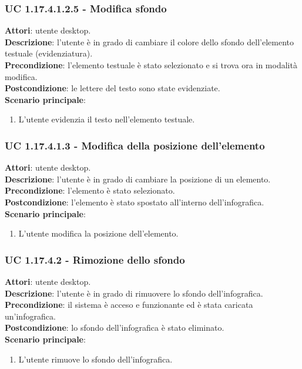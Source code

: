 \subsubsection{UC 1.17.4.1.2.5 - Modifica sfondo}{
	\label{uc1.17.4.1.2.5}
	\textbf{Attori}: utente desktop. \\
	\textbf{Descrizione}: l'utente è in grado di cambiare il colore dello sfondo dell’elemento testuale (evidenziatura). \\
	\textbf{Precondizione}: l'elemento testuale è stato selezionato e si trova ora in modalità modifica.\\
	\textbf{Postcondizione}: le lettere del testo sono state evidenziate.\\
	\textbf{Scenario principale}:
	\begin{enumerate}
		\item L'utente evidenzia il testo nell’elemento testuale.
	\end{enumerate}			
	}
\subsubsection{UC 1.17.4.1.3 - Modifica della posizione dell'elemento}{
	\label{uc1.17.4.1.3}
	\textbf{Attori}: utente desktop. \\
	\textbf{Descrizione}: l'utente è in grado di cambiare la posizione di un elemento. \\
	\textbf{Precondizione}: l'elemento è stato selezionato.\\
	\textbf{Postcondizione}: l'elemento è stato spostato all’interno dell’infografica.\\
	\textbf{Scenario principale}:
	\begin{enumerate}
		\item L'utente modifica la posizione dell'elemento.
	\end{enumerate}			
	}
\subsubsection{UC 1.17.4.2 - Rimozione dello sfondo}{
	\label{uc1.17.4.2}
	\textbf{Attori}: utente desktop. \\
	\textbf{Descrizione}: l'utente è in grado di rimuovere lo sfondo dell’infografica. \\
	\textbf{Precondizione}: il sistema è acceso e funzionante ed è stata caricata un'infografica.	\\
	\textbf{Postcondizione}: lo sfondo dell'infografica è stato eliminato.\\
	\textbf{Scenario principale}:
	\begin{enumerate}
		\item L'utente rimuove lo sfondo dell'infografica.
	\end{enumerate}			
	}
